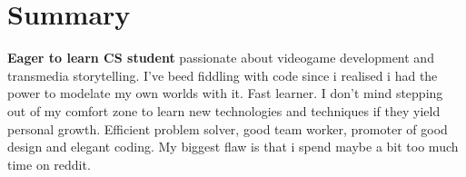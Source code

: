 \section{Summary}

\textbf{Eager to learn CS student} passionate about videogame development and transmedia storytelling. I've beed fiddling with code since i realised i had the power to modelate my own worlds with it. Fast learner. I don't mind stepping out of my comfort zone to learn new technologies and techniques if they yield personal growth. Efficient problem solver, good team worker, promoter of good design and elegant coding. My biggest flaw is that i spend maybe a bit too much time on reddit.  

